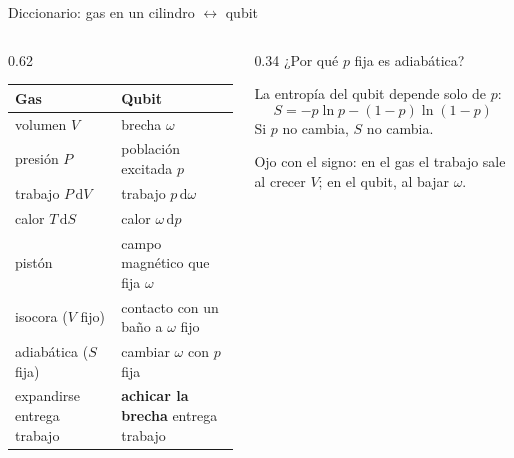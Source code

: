 \documentclass[10pt,aspectratio=169]{beamer}
\newcommand{\nota}[1]{{\small\color{gray}#1}}
\newcommand{\clave}[1]{{\color{usmBlue}\bfseries #1}}
\begin{document}
\begin{frame}{Diccionario: gas en un cilindro $\leftrightarrow$ qubit}
\begin{columns}[c]
\begin{column}{0.62\textwidth}
\renewcommand{\arraystretch}{1.35}
\begin{tabular}{ll}
\toprule
\textbf{Gas} & \textbf{Qubit}\\
\midrule
volumen $V$ & brecha $\omega$\\
presión $P$ & población excitada $p$\\
trabajo $P\,\mathrm{d}V$ & trabajo $p\,\mathrm{d}\omega$\\
calor $T\,\mathrm{d}S$ & calor $\omega\,\mathrm{d}p$\\
pistón & campo magnético que fija $\omega$\\
isocora ($V$ fijo) & contacto con un baño a $\omega$ fijo\\
adiabática ($S$ fija) & cambiar $\omega$ con $p$ fija\\
expandirse entrega trabajo & \clave{achicar la brecha} entrega trabajo\\
\bottomrule
\end{tabular}
\end{column}
\begin{column}{0.34\textwidth}
  ¿Por qué $p$ fija es adiabática?

  \vspace{0.3em}
  La entropía del qubit depende solo de $p$:
  \[ S = -p\ln p - (1-p)\ln(1-p) \]
  Si $p$ no cambia, $S$ no cambia.

  \vspace{0.6em}
  \nota{Ojo con el signo: en el gas el trabajo sale al crecer $V$; en el qubit, al bajar $\omega$.}
\end{column}
\end{columns}
\end{frame}
\end{document}
